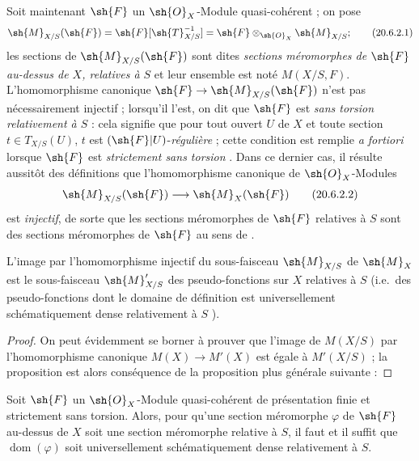 \begin{env}[20.6.2]
Soit maintenant $\sh{F}$ un $\sh{O}_X$-Module quasi-cohérent ; on pose
\[
\label{IV.20.6.2.1}
  \sh{M}_{X/S}(\sh{F})=\sh{F}[\sh{T}_{X/S}^{-1}]=\sh{F}\otimes_{\sh{O}_X}\sh{M}_{X/S};
  \tag{20.6.2.1}
\]
les sections de $\sh{M}_{X/S}(\sh{F})$ sont dites \emph{sections méromorphes de $\sh{F}$ au-dessus de $X$, relatives à $S$} et leur ensemble est noté $M(X/S,F)$.
L'homomorphisme canonique $\sh{F}\to\sh{M}_{X/S}(\sh{F})$ n'est pas nécessairement injectif ; lorsqu'il l'est, on dit que $\sh{F}$ est \emph{sans torsion relativement à $S$} : cela signifie que pour tout ouvert $U$ de $X$ et toute section $t\in T_{X/S}(U)$, $t$ est $(\sh{F}|U)$-\emph{régulière} ; cette condition est remplie \emph{a fortiori} lorsque $\sh{F}$ est \emph{strictement sans torsion} .
Dans ce dernier cas, il résulte aussitôt des définitions  que l'homomorphisme canonique de $\sh{O}_X$-Modules
\[
\label{IV.20.6.2.2}
  \sh{M}_{X/S}(\sh{F})\to\sh{M}_X(\sh{F})
  \tag{20.6.2.2}
\]
est \emph{injectif}, de sorte que les sections méromorphes de $\sh{F}$ relatives à $S$ sont des sections méromorphes de $\sh{F}$ au sens de .
\end{env}

\begin{proposition}[20.6.3]
\label{IV.20.6.3}
L'image par l'homomorphisme injectif  du sous-faisceau $\sh{M}_{X/S}$ de $\sh{M}_X$ est le sous-faisceau $\sh{M}'_{X/S}$ des pseudo-fonctions sur $X$ relatives à $S$ \textup{(i.e.}\ des pseudo-fonctions dont le domaine de définition est universellement schématiquement dense relativement à $S$ \textup{)}.
\end{proposition}

\begin{proof}
On peut évidemment se borner à prouver que l'image de $M(X/S)$ par l'homomorphisme canonique $M(X)\to M'(X)$ est égale à $M'(X/S)$ ; la proposition est alors conséquence de la proposition plus générale suivante :
\end{proof}

\begin{proposition}[20.6.4]
\label{IV.20.6.4}
Soit $\sh{F}$ un $\sh{O}_X$-Module quasi-cohérent de présentation finie et strictement sans torsion.
Alors, pour qu'une section méromorphe $\varphi$ de $\sh{F}$ au-dessus de $X$ soit une section méromorphe relative à $S$, il faut et il suffit que $\operatorname{dom}(\varphi)$ soit universellement schématiquement dense relativement à $S$.
\end{proposition}

